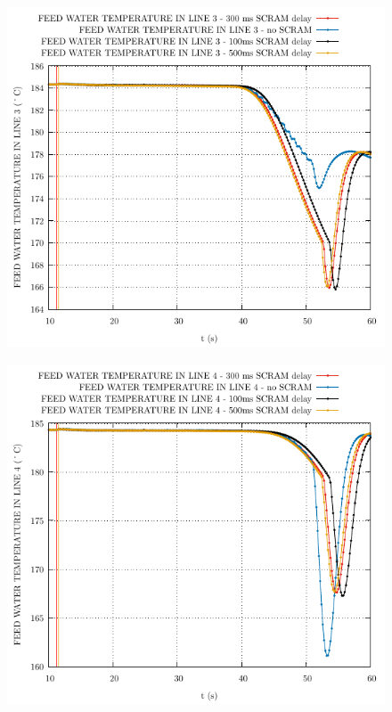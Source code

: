 \documentclass{article}
\begin{document}
\begin{multicols}{2}
\begin{figure}[H]
\end{figure}
\begin{figure}[H]
\centering
\includegraphics[width=\columnwidth]{./graphs/FEED WATER TEMPERATURE IN LINE 3_comp.pdf}
\end{figure}
\begin{figure}[H]
\centering
\includegraphics[width=\columnwidth]{./graphs/FEED WATER TEMPERATURE IN LINE 4_comp.pdf}

\end{figure}
\end{multicols}
\end{document}
